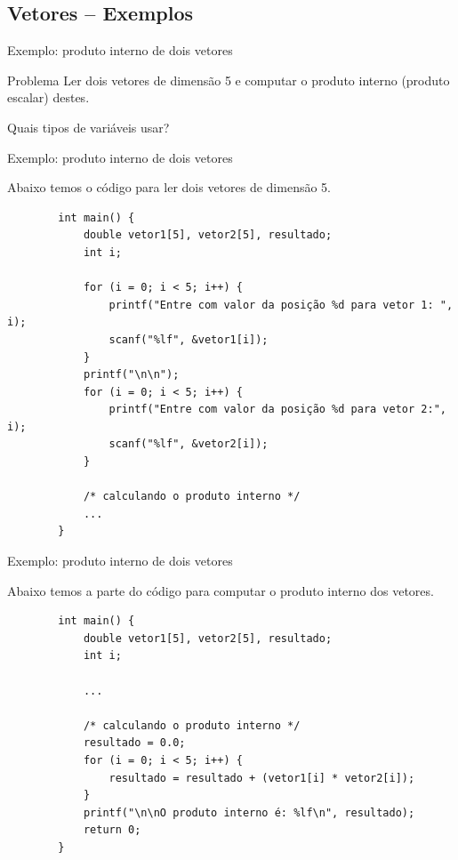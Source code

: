 \documentclass[handout]{beamer}
\begin{document}
\subsection{Vetores -- Exemplos}

\begin{frame}[fragile]{Exemplo: produto interno de dois vetores}

    \begin{block}{Problema}
        Ler dois vetores de dimensão 5 e computar o produto interno (produto escalar) destes.
    \end{block}

    Quais tipos de variáveis usar?

\end{frame}

\begin{frame}[fragile]{Exemplo: produto interno de dois vetores}

    Abaixo temos o código para ler dois vetores de dimensão 5.

    \begin{verbatim}
        int main() {
            double vetor1[5], vetor2[5], resultado;
            int i;

            for (i = 0; i < 5; i++) {
                printf("Entre com valor da posição %d para vetor 1: ", i);
                scanf("%lf", &vetor1[i]);
            }
            printf("\n\n");
            for (i = 0; i < 5; i++) {
                printf("Entre com valor da posição %d para vetor 2:", i);
                scanf("%lf", &vetor2[i]);
            }

            /* calculando o produto interno */
            ...
        }
    \end{verbatim}

\end{frame}

\begin{frame}[fragile]{Exemplo: produto interno de dois vetores}

    Abaixo temos a parte do código para computar o produto interno dos vetores.

    \begin{verbatim}
        int main() {
            double vetor1[5], vetor2[5], resultado;
            int i;

            ...

            /* calculando o produto interno */
            resultado = 0.0;
            for (i = 0; i < 5; i++) {
                resultado = resultado + (vetor1[i] * vetor2[i]);
            }
            printf("\n\nO produto interno é: %lf\n", resultado);
            return 0;
        }
    \end{verbatim}

\end{frame}
\end{document}
